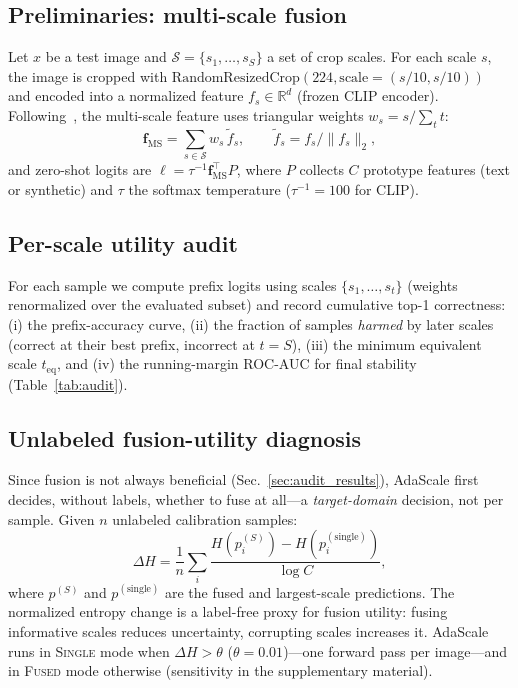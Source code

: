 \documentclass{article}
\def\f{{\mathbf f}}
\begin{document}
\subsection{Preliminaries: multi-scale fusion}
Let $x$ be a test image and $\mathcal{S}=\{s_1,\dots,s_S\}$ a set of crop
scales. For each scale $s$, the image is cropped with
$\text{RandomResizedCrop}(224, \text{scale}=(s/10, s/10))$ and encoded
into a normalized feature $f_s \in \mathbb{R}^d$ (frozen CLIP encoder).
Following~\cite{shi2026lgclip}, the
multi-scale feature uses triangular weights $w_s = s / \sum_t t$:
\begin{equation}
\f_{\text{MS}} = \sum_{s \in \mathcal{S}} w_s \, \tilde{f}_s ,
\qquad
\tilde{f}_s = f_s / \|f_s\|_2 ,
\label{eq:fusion}
\end{equation}
and zero-shot logits are
$\ell = \tau^{-1} \f_{\text{MS}}^\top P$, where $P$ collects $C$
prototype features (text or synthetic) and $\tau$ the softmax
temperature ($\tau^{-1}{=}100$ for CLIP).

\subsection{Per-scale utility audit}
\label{sec:audit}
For each sample we compute prefix logits using scales
$\{s_1,\dots,s_t\}$ (weights renormalized over the evaluated subset)
and record cumulative top-1 correctness: (i) the prefix-accuracy
curve, (ii) the fraction of samples \emph{harmed} by later scales
(correct at their best prefix, incorrect at $t{=}S$), (iii) the
minimum equivalent scale $t_{\text{eq}}$, and (iv) the running-margin
ROC-AUC for final stability (Table~\ref{tab:audit}).

\subsection{Unlabeled fusion-utility diagnosis}
\label{sec:mode}
Since fusion is not always beneficial (Sec.~\ref{sec:audit_results}),
AdaScale first decides, without labels, whether to fuse at all---a
\emph{target-domain} decision, not per sample. Given $n$ unlabeled calibration samples:
\begin{equation}
\Delta H = \frac{1}{n}\sum_i
\frac{H\!\left(p^{(S)}_i\right) - H\!\left(p^{(\text{single})}_i\right)}{\log C},
\label{eq:mode}
\end{equation}
where $p^{(S)}$ and $p^{(\text{single})}$ are the fused and largest-scale
predictions. The normalized entropy change is a label-free proxy for
fusion utility: fusing informative scales reduces uncertainty,
corrupting scales increases it. AdaScale runs in
\textsc{Single} mode when $\Delta H > \theta$ ($\theta{=}0.01$)---one
forward pass per image---and in \textsc{Fused} mode otherwise
(sensitivity in the supplementary material).
\end{document}
